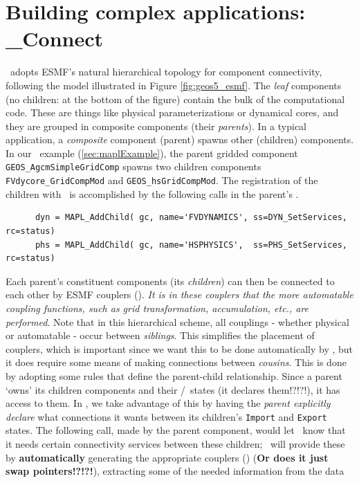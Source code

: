 \section{Building complex applications: \ggn\_Connect}
\label{sec:maplconnect}

\ggn\ adopts ESMF's natural hierarchical topology for
component connectivity, following the model illustrated in Figure 
\ref{fig:geos5_esmf}. The \emph{leaf}
components (no children: at the bottom of the figure)
contain the bulk of the computational code. These are things like
physical parameterizations or dynamical cores, and they are grouped in
composite components (their {\em parents}). In a typical application,
a \emph{composite} component (parent) spawns
other (children) components. In our \ggn\ example (\ref{sec:maplExample}),
the parent gridded component \texttt{GEOS\_AgcmSimpleGridComp} spawns two
children components \texttt{FVdycore\_GridCompMod} and
\texttt{GEOS\_hsGridCompMod}. The registration
of the children with \ggn\ is accomplished by the following calls in the
parent's \ssv.
\begin{verbatim}
      dyn = MAPL_AddChild( gc, name='FVDYNAMICS', ss=DYN_SetServices, rc=status)
      phs = MAPL_AddChild( gc, name='HSPHYSICS',  ss=PHS_SetServices, rc=status)
\end{verbatim}
Each parent's constituent components (its {\em children})
can then be connected to each other by ESMF couplers (\ecc).
\emph{It is in these couplers that the more automatable coupling functions,
such as grid transformation, accumulation, etc., are performed}.
Note that in this hierarchical scheme, all couplings - whether physical
or automatable - occur between {\em siblings}. This simplifies the
placement of couplers, which is important since we want this
to be done automatically by \ggn, but it does require some
means of making connections between \emph{cousins}. This is done by
adopting some rules that define the parent-child relationship. Since a
parent `owns' its children components and their \IM/\EX\
states (it declares them!?!?!), it has access to them. In \ggn, we
take advantage of this by having the \emph{parent explicitly declare} what
connections it wants between its children's {\tt Import} and {\tt Export}
states. The following call,
made by the parent component, would let \ggn\ know that it needs
certain connectivity services between these children; \ggn\  
will provide these by \textbf{automatically} generating the appropriate
couplers (\ecc) (\textbf{Or does it just swap pointers!?!?!}),
extracting some of the needed information from the data
